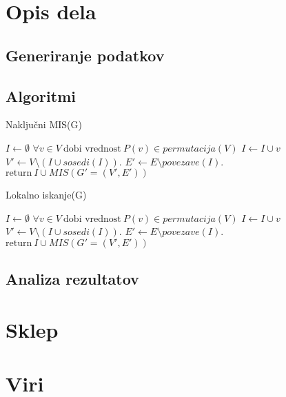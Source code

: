 \documentclass[a4paper, 12pt]{article}
\begin{document}
\newpage

\section{Opis dela}

\subsection{Generiranje podatkov}

\subsection{Algoritmi}

\begin{algorithm}
\caption{Naključni MIS(G)}\label{euclid}
\begin{algorithmic}[1]
\State $\textit{I} \gets \emptyset$
\State $\forall v \in V\ \text{dobi vrednost}\ \textit{P}(v) \in \textit{permutacija}(V)$
\State $ I \gets I \cup v $
\EndIf
\State $V' \gets V \setminus (I \cup \textit{sosedi}(I))$.
\State $E' \gets E \setminus \textit{povezave}(I)$.
\State $\text{return}\  I \cup \textit{MIS}(G'=(V', E'))$
\end{algorithmic}
\end{algorithm}

\begin{algorithm}
    \caption{Lokalno iskanje(G)}\label{euclid}
    \begin{algorithmic}[1]
    \State $\textit{I} \gets \emptyset$
    \State $\forall v \in V\ \text{dobi vrednost}\ \textit{P}(v) \in \textit{permutacija}(V)$
    \State $ I \gets I \cup v $
    \EndIf
    \State $V' \gets V \setminus (I \cup \textit{sosedi}(I))$.
    \State $E' \gets E \setminus \textit{povezave}(I)$.
    \State $\text{return}\  I \cup \textit{MIS}(G'=(V', E'))$
    \end{algorithmic}
    \end{algorithm}

\subsection{Analiza rezultatov}

\section{Sklep}

\section{Viri}
\end{document}
